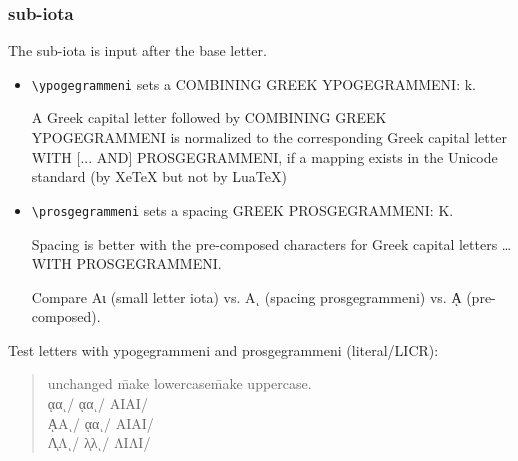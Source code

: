\documentclass[a4paper]{article}
\begin{document}
\subsubsection{sub-iota}

The sub-iota is input after the base letter.

\begin{itemize}
\item 
  \verb|\ypogegrammeni| sets a COMBINING GREEK YPOGEGRAMMENI:
  \textalpha\ypogegrammeni{} k\ypogegrammeni{}.

  A Greek capital letter followed by COMBINING GREEK YPOGEGRAMMENI is
  normalized to the corresponding Greek capital letter WITH [... AND]
  PROSGEGRAMMENI, if a mapping exists in the Unicode standard (by XeTeX but
  not by LuaTeX)

\item \verb|\prosgegrammeni| sets a spacing GREEK PROSGEGRAMMENI:
  \textAlpha\prosgegrammeni{} K\prosgegrammeni{}.

  Spacing is better with the pre-composed characters for Greek capital
  letters \ldots{} WITH PROSGEGRAMMENI.

  Compare Αι (small letter iota) vs. Αι (spacing prosgegrammeni) vs. ᾼ
  (pre-composed).
  

\end{itemize}
%
Test letters with ypogegrammeni and prosgegrammeni (literal/LICR):

\begin{quote}
\begin{tabbing}

  unchanged \quad\=  make lowercase\quad\=  make uppercase. \\

  ᾳαι/\textalpha\ypogegrammeni \textalpha\prosgegrammeni{} \>
  \MakeLowercase{ᾳαι/\textalpha\ypogegrammeni \textalpha\prosgegrammeni} \>
  \MakeUppercase{ᾳαι/\textalpha\ypogegrammeni \textalpha\prosgegrammeni} \\

  ᾼΑι/\textAlpha\ypogegrammeni \textAlpha\prosgegrammeni{} \>
  \MakeLowercase{ᾼΑι/\textAlpha\ypogegrammeni \textAlpha\prosgegrammeni} \>
  \MakeUppercase{ᾼΑι/\textAlpha\ypogegrammeni \textAlpha\prosgegrammeni} \\

  ΛͅΛι/\textLambda\ypogegrammeni \textLambda\prosgegrammeni{} \>
  \MakeLowercase{ΛͅΛι/\textLambda\ypogegrammeni \textLambda\prosgegrammeni} \>
  \MakeUppercase{ΛͅΛι/\textLambda\ypogegrammeni \textLambda\prosgegrammeni}

\end{tabbing}
\end{quote}
\end{document}
